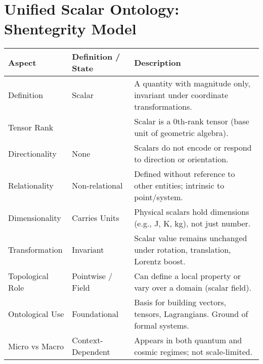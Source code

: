 \documentclass{article}
\begin{document}
\section*{Unified Scalar Ontology: Shentegrity Model}

\small
{}

\begin{longtable}{|>{\raggedright\arraybackslash}p{4cm}|>{\raggedright\arraybackslash}p{3.5cm}|>{\raggedright\arraybackslash}p{8cm}|}
\hline
\rowcolor{black!20}
\textbf{Aspect} & \textbf{Definition / State} & \textbf{Description} \\
\hline
Definition & Scalar & A quantity with magnitude only, invariant under coordinate transformations. \\
Tensor Rank & 0 & Scalar is a 0th-rank tensor (base unit of geometric algebra). \\
Directionality & None & Scalars do not encode or respond to direction or orientation. \\
Relationality & Non-relational & Defined without reference to other entities; intrinsic to point/system. \\
Dimensionality & Carries Units & Physical scalars hold dimensions (e.g., J, K, kg), not just number. \\
Transformation & Invariant & Scalar value remains unchanged under rotation, translation, Lorentz boost. \\
Topological Role & Pointwise / Field & Can define a local property or vary over a domain (scalar field). \\
Ontological Use & Foundational & Basis for building vectors, tensors, Lagrangians. Ground of formal systems. \\
Micro vs Macro & Context-Dependent & Appears in both quantum and cosmic regimes; not scale-limited. \\
\hline
\end{longtable}
\end{document}
